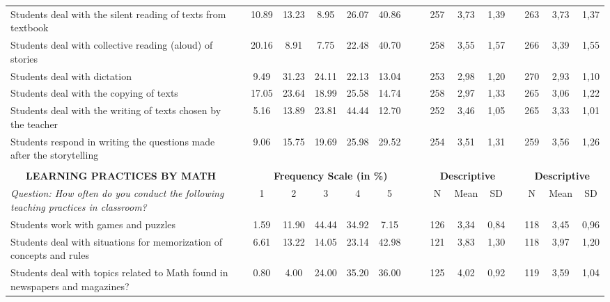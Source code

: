 \documentclass[a4paper, 12pt]{article}
\begin{document}
\begin{landscape}
\begin{table}[htbp]
\begin{adjustbox}{width=10.5in,totalheight=6in}
\begin{tabular}{llcccccccccccccc}
    Students deal with the silent reading of texts from textbook   &       & 10.89 & 13.23 & 8.95  & 26.07 & 40.86 &       &       & 257   & 3,73  & 1,39  &       & 263   & 3,73  & 1,37 \\
    Students deal with collective reading (aloud) of stories &       & 20.16 & 8.91  & 7.75  & 22.48 & 40.70 &       &       & 258   & 3,55  & 1,57  &       & 266   & 3,39  & 1,55 \\
    Students deal with dictation &       & 9.49  & 31.23 & 24.11 & 22.13 & 13.04 &       &       & 253   & 2,98  & 1,20  &       & 270   & 2,93  & 1,10 \\
    Students deal with the copying of texts &       & 17.05 & 23.64 & 18.99 & 25.58 & 14.74 &       &       & 258   & 2,97  & 1,33  &       & 265   & 3,06  & 1,22 \\
    Students deal with the writing of texts chosen by the teacher &       & 5.16  & 13.89 & 23.81 & 44.44 & 12.70 &       &       & 252   & 3,46  & 1,05  &       & 265   & 3,33  & 1,01 \\
    Students respond in writing the questions made after the storytelling &       & 9.06  & 15.75 & 19.69 & 25.98 & 29.52 &       &       & 254   & 3,51  & 1,31  &       & 259   & 3,56  & 1,26 \\
          &       &       &       &       &       &       &       &       &       &       &       &       &       &       &  \\
    \multicolumn{1}{c}{\textbf{LEARNING PRACTICES BY MATH}} &       & \multicolumn{6}{c}{\textbf{Frequency Scale (in \%)}} &       & \multicolumn{3}{c}{\textbf{Descriptive}} &       & \multicolumn{3}{c}{\textbf{Descriptive}} \\
\cmidrule{1-1}\cmidrule{3-7}\cmidrule{10-12}\cmidrule{14-16}    \textit{Question: How often do you conduct the following teaching practices in classroom?} &       & 1     & 2     & 3     & 4     & 5     &       &       & N     & Mean  & SD    &       & N     & Mean  & SD \\
\cmidrule{1-1}\cmidrule{3-7}\cmidrule{10-12}\cmidrule{14-16}    Students work with games and puzzles &       & 1.59  & 11.90 & 44.44 & 34.92 & 7.15  &       &       & 126   & 3,34  & 0,84  &       & 118   & 3,45  & 0,96 \\
    Students deal with situations for memorization of concepts and rules &       & 6.61  & 13.22 & 14.05 & 23.14 & 42.98 &       &       & 121   & 3,83  & 1,30  &       & 118   & 3,97  & 1,20 \\
    Students deal with topics related to Math found in newspapers and magazines? &       & 0.80  & 4.00  & 24.00 & 35.20 & 36.00 &       &       & 125   & 4,02  & 0,92  &       & 119   & 3,59  & 1,04 \\

\end{tabular}
\end{adjustbox}
\end{table}
\end{landscape}
\end{document}
